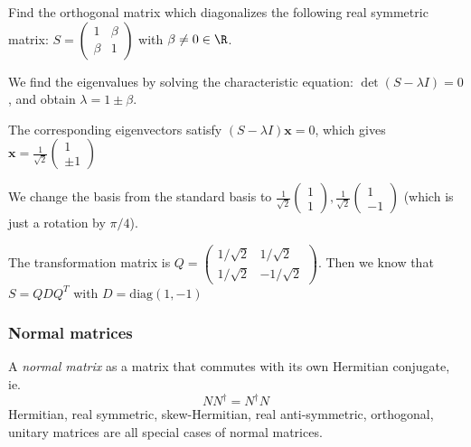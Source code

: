 \documentclass[a4paper]{article}
\begin{document}
      \begin{eg}
        Find the orthogonal matrix which diagonalizes the following real symmetric matrix: $S = 
        \begin{pmatrix}
          1 & \beta\\
          \beta & 1
        \end{pmatrix}$ with $\beta \not= 0 \in \R$.

        We find the eigenvalues by solving the characteristic equation: $\det(S - \lambda I) = 0$, and obtain $\lambda = 1\pm \beta$.

        The corresponding eigenvectors satisfy $(S - \lambda I)\mathbf{x} = 0$, which gives $\displaystyle \mathbf{x} = \frac{1}{\sqrt{2}}
        \begin{pmatrix}
          1\\
          \pm1
        \end{pmatrix}$

        We change the basis from the standard basis to $
        \displaystyle
        \frac{1}{\sqrt{2}}\begin{pmatrix}
          1\\1
        \end{pmatrix},
        \frac{1}{\sqrt{2}}
        \begin{pmatrix}
          1\\-1
        \end{pmatrix}$ (which is just a rotation by $\pi/4$).

        The transformation matrix is $
        Q = \begin{pmatrix}
          1/\sqrt{2} & 1/\sqrt{2}\\
          1/\sqrt{2} & -1/\sqrt{2}
        \end{pmatrix}$. Then we know that $S = QDQ^T$ with $D = \mathrm{diag}(1, -1)$
      \end{eg}
      \subsubsection{Normal matrices}
      \begin{defi}
        A \emph{normal matrix} as a matrix that commutes with its own Hermitian conjugate, ie.
        \[
          NN^\dagger = N^\dagger N
        \]
        Hermitian, real symmetric, skew-Hermitian, real anti-symmetric, orthogonal, unitary matrices are all special cases of normal matrices.  
      \end{defi}
\end{document}
